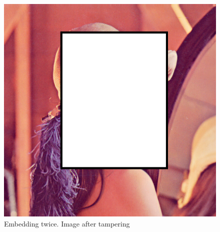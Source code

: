 \documentclass[12pt]{article}
\begin{document}
\begin{figure}[h]
\centerline{%
\includegraphics[scale=0.45]{"Lena Embed twice 0.7 threshold/finalImage - Copy"}%
}%
\caption{Embedding twice. Image after tampering}
\label{fig:lenaEmbedTwiceTampered}
\end{figure}
\end{document}
